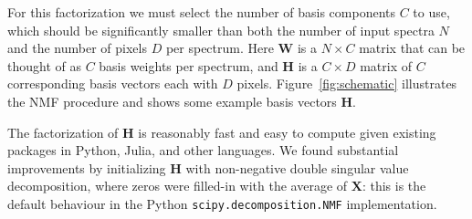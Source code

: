 \documentclass[modern]{aastex631}
\renewcommand{\vec}[1]{\mathbf{#1}}
\newcommand{\vectheta}{\boldsymbol{\theta}}
\newcommand{\vecpsi}{\boldsymbol{\psi}}
\newcommand{\vecW}{\mathbf{W}}
\newcommand{\vecH}{\mathbf{H}}
\newcommand{\vecX}{\mathbf{X}}
\begin{document}
For this factorization we must select the number of basis components $C$ to use, which should be significantly smaller than both the number of input spectra $N$ and the number of pixels $D$ per spectrum. Here $\vec{W}$ is a $N \times C$ matrix that can be thought of as $C$ basis weights per spectrum, and $\vec{H}$ is a $C \times D$ matrix of $C$ corresponding basis vectors each with $D$ pixels. Figure~\ref{fig:schematic} illustrates the NMF procedure and shows some example basis vectors $\vec{H}$.\\




\begin{figure*}
    \caption{A schematic illustrating the non-negative matrix factorization procedure, with some example basis vectors computed from the application to \emph{BOSS} spectra. \label{fig:schematic}}
\end{figure*}

The factorization of $\vecH$ is reasonably fast and easy to compute given existing packages in Python, Julia, and other languages. We found substantial improvements by initializing $\vecH$ with non-negative double singular value decomposition, where zeros were filled-in with the average of $\vecX$: this is the default behaviour in the Python \texttt{scipy.decomposition.NMF} implementation. \\

\end{document}
